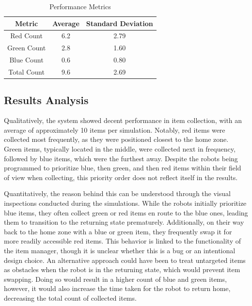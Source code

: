 \documentclass[conference]{IEEEtran}
\begin{document}
\begin{table}[htbp]
\caption{Performance Metrics}
\begin{center}
\begin{tabular}{|c|c|c|}
\hline
Metric & Average & Standard Deviation \\
\hline
Red Count & 6.2 & 2.79 \\
Green Count & 2.8 & 1.60 \\
Blue Count & 0.6 & 0.80 \\
Total Count & 9.6 & 2.69 \\
\hline
\end{tabular}
\label{tab:performance}
\end{center}
\end{table}

\subsection{Results Analysis}

Qualitatively, the system showed decent performance in item collection, with an average of approximately 10 items per simulation. Notably, red items were collected most frequently, as they were positioned closest to the home zone. Green items, typically located in the middle, were collected next in frequency, followed by blue items, which were the furthest away. Despite the robots being programmed to prioritize blue, then green, and then red items within their field of view when collecting, this priority order does not reflect itself in the results.

Quantitatively, the reason behind this can be understood through the visual inspections conducted during the simulations. While the robots initially prioritize blue items, they often collect green or red items en route to the blue ones, leading them to transition to the returning state prematurely. Additionally, on their way back to the home zone with a blue or green item, they frequently swap it for more readily accessible red items. This behavior is linked to the functionality of the item manager, though it is unclear whether this is a bug or an intentional design choice. An alternative approach could have been to treat untargeted items as obstacles when the robot is in the returning state, which would prevent item swapping. Doing so would result in a higher count of blue and green items, however, it would also increase the time taken for the robot to return home, decreasing the total count of collected items.
\end{document}
